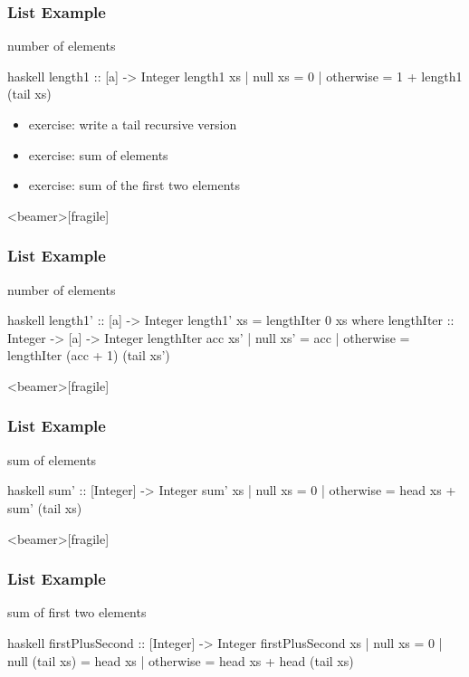 \documentclass[dvipsnames]{beamer}
\theoremstyle{plain}
\begin{document}
\begin{frame}[fragile]
  \frametitle{List Example}

  \begin{exampleblock}{number of elements}
    \begin{pygments}{haskell}
length1 :: [a] -> Integer
length1 xs
  | null xs   = 0
  | otherwise = 1 + length1 (tail xs)
    \end{pygments}
  \end{exampleblock}

  \pause
  \begin{itemize}
    \item exercise: write a tail recursive version
    \item exercise: sum of elements
    \item exercise: sum of the first two elements
  \end{itemize}
\end{frame}

\begin{frame}<beamer>[fragile]
  \frametitle{List Example}

  \begin{exampleblock}{number of elements}
    \begin{pygments}{haskell}
length1' :: [a] -> Integer
length1' xs = lengthIter 0 xs
  where
    lengthIter :: Integer -> [a] -> Integer
    lengthIter acc xs'
      | null xs' = acc
      | otherwise = lengthIter (acc + 1) (tail xs')
    \end{pygments}
  \end{exampleblock}
\end{frame}

\begin{frame}<beamer>[fragile]
  \frametitle{List Example}

  \begin{exampleblock}{sum of elements}
    \begin{pygments}{haskell}
sum' :: [Integer] -> Integer
sum' xs
  | null xs   = 0
  | otherwise = head xs + sum' (tail xs)
    \end{pygments}
  \end{exampleblock}
\end{frame}

\begin{frame}<beamer>[fragile]
  \frametitle{List Example}

  \begin{exampleblock}{sum of first two elements}
    \begin{pygments}{haskell}
firstPlusSecond :: [Integer] -> Integer
firstPlusSecond xs
  | null xs        = 0
  | null (tail xs) = head xs
  | otherwise      = head xs + head (tail xs)
    \end{pygments}
  \end{exampleblock}
\end{frame}
\end{document}
